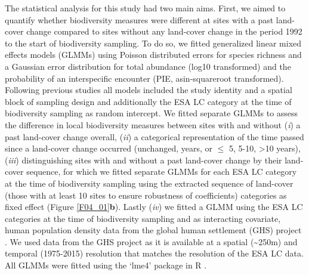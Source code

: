 The statistical analysis for this study had two main aims. First, we aimed to quantify whether biodiversity measures were different at sites with a past land-cover change compared to sites without any land-cover change in the period 1992 to the start of biodiversity sampling. To do so, we fitted generalized linear mixed effects models (GLMMs) using Poisson distributed errors for species richness and a Gaussian error distribution for total abundance (log10 transformed) and the probability of an interspecific encounter (PIE, asin-squareroot transformed). Following previous studies \citep{Newbold2015,Jung2016} all models included the study identity and a spatial block of sampling design and additionally the ESA LC category at the time of biodiversity sampling as random intercept. We fitted separate GLMMs to assess the difference in local biodiversity measures between sites with and without (\textit{i}) a past land-cover change overall, (\textit{ii}) a categorical representation of the time passed since a land-cover change occurred (unchanged,  years, or $\leq$ 5, 5-10, >10 years), (\textit{iii}) distinguishing sites with and without a past land-cover change by their land-cover sequence, for which we fitted separate GLMMs for each ESA LC category at the time of biodiversity sampling using the extracted sequence of land-cover (those with at least 10 sites to ensure robustness of coefficients) categories as fixed effect (Figure \ref{F04_01}\textbf{b}). Lastly (\textit{iv}) we fitted a GLMM using the ESA LC categories at the time of biodiversity sampling and as interacting covariate, human population density data from the global human settlement (GHS) project \citep{Pesaresi2013,Pesaresi2016}. We used data from the GHS project as it is available at a spatial (\textasciitilde 250m) and temporal (1975-2015) resolution that matches the resolution of the ESA LC data. All GLMMs were fitted using the ‘lme4’ package \citep[ver. 1.1-18-1,][]{lme4} in R \citep[ver. 3.5, ][]{RTeam2014}.

